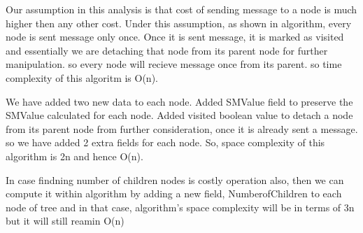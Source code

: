 Our assumption in this analysis is that cost of sending message to a node is much higher then any other cost. Under this assumption, as shown in algorithm, every node is sent message only once. Once it is sent message, it is marked as visited and essentially we are detaching that node from its parent node for further manipulation. so every node will recieve message once from its parent. so time complexity of this algoritm is O(n). 

We have added two new data to each node. Added SMValue field to preserve the SMValue calculated for each node. Added visited boolean value to detach a node from its parent node from further consideration, once it is already sent a message. so we have added 2 extra fields for each node. So, space complexity of this algorithm is 2n and hence O(n).  

In case findning number of children nodes is costly operation also, then we can compute it within algorithm by adding a new field, NumberofChildren to each node of tree and in that case, algorithm's space complexity will be in terms of 3n but it will still reamin O(n)


